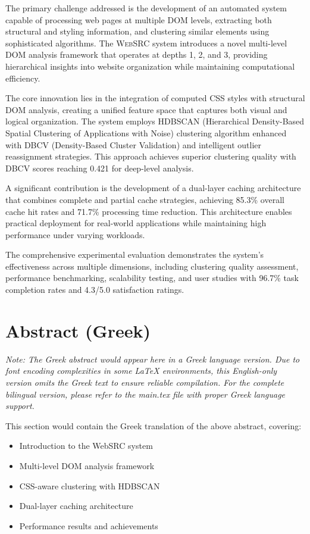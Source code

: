 \documentclass[12pt,a4paper,oneside]{book}
\newcommand{\name}{\textsc{WebSRC}}
\begin{document}
The primary challenge addressed is the development of an automated system capable of processing web pages at multiple DOM levels, extracting both structural and styling information, and clustering similar elements using sophisticated algorithms. The {\name} system introduces a novel multi-level DOM analysis framework that operates at depths 1, 2, and 3, providing hierarchical insights into website organization while maintaining computational efficiency.

The core innovation lies in the integration of computed CSS styles with structural DOM analysis, creating a unified feature space that captures both visual and logical organization. The system employs HDBSCAN (Hierarchical Density-Based Spatial Clustering of Applications with Noise) clustering algorithm enhanced with DBCV (Density-Based Cluster Validation) and intelligent outlier reassignment strategies. This approach achieves superior clustering quality with DBCV scores reaching 0.421 for deep-level analysis.

A significant contribution is the development of a dual-layer caching architecture that combines complete and partial cache strategies, achieving 85.3\% overall cache hit rates and 71.7\% processing time reduction. This architecture enables practical deployment for real-world applications while maintaining high performance under varying workloads.

The comprehensive experimental evaluation demonstrates the system's effectiveness across multiple dimensions, including clustering quality assessment, performance benchmarking, scalability testing, and user studies with 96.7\% task completion rates and 4.3/5.0 satisfaction ratings.

\chapter*{Abstract (Greek)}

\textit{Note: The Greek abstract would appear here in a Greek language version. Due to font encoding complexities in some LaTeX environments, this English-only version omits the Greek text to ensure reliable compilation. For the complete bilingual version, please refer to the main.tex file with proper Greek language support.}

This section would contain the Greek translation of the above abstract, covering:
\begin{itemize}
\item Introduction to the WebSRC system
\item Multi-level DOM analysis framework
\item CSS-aware clustering with HDBSCAN
\item Dual-layer caching architecture
\item Performance results and achievements
\end{itemize}
\end{document}
